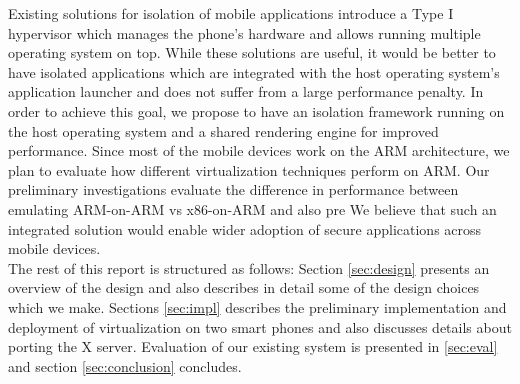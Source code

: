 Existing solutions for isolation of mobile applications introduce a Type I hypervisor \cite{mvp, okl4} which manages the phone's hardware and allows running multiple operating system on top. While these solutions are useful, it would be better to have isolated applications which are integrated with the host operating system's application launcher and does not suffer from a large performance penalty. In order to achieve this goal, we propose to have an isolation framework running on the host operating system and a shared rendering engine for improved performance. Since most of the mobile devices work on the ARM architecture, we plan to evaluate how different virtualization techniques perform on ARM. Our preliminary investigations evaluate the difference in performance between emulating ARM-on-ARM vs x86-on-ARM and also pre We believe that such an integrated solution would enable wider adoption of secure applications across mobile devices.\\

The rest of this report is structured as follows: Section \ref{sec:design} presents an overview of the design and also describes in detail some of the design choices which we make. Sections \ref{sec:impl} describes the preliminary implementation and deployment of virtualization on two smart phones and also discusses details about porting the X server. Evaluation of our existing system is presented in \ref{sec:eval} and section \ref{sec:conclusion} concludes.
